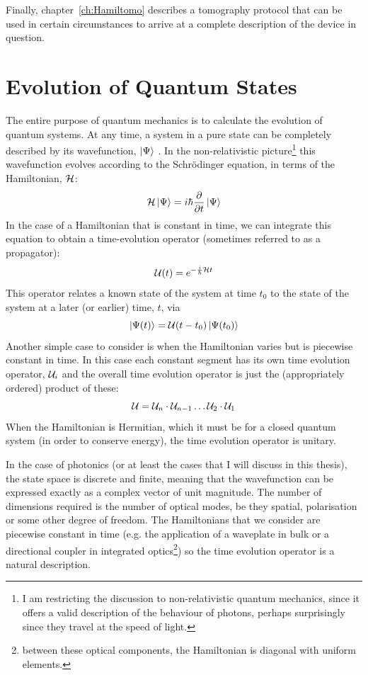 Finally, chapter~\ref{ch:Hamiltomo} describes a tomography protocol that can be
used in certain circumstances to arrive at a complete description of the device
in question.

\section{Evolution of Quantum States}
\label{sec:Evolution}
The entire purpose of quantum mechanics is to calculate the evolution of quantum
systems. At any time, a system in a pure state can be completely described by
its wavefunction, \(\left|\Psi\right\rangle\) \cite{pbr}. In the non-relativistic
picture\footnote{I am restricting the discussion to non-relativistic quantum
mechanics, since it offers a valid description of the behaviour of photons,
perhaps surprisingly since they travel at the speed of light.} this
wavefunction evolves according to the Schr\"odinger equation, in terms of the
Hamiltonian, \(\mathcal{H}\):
\begin{equation}
  \mathcal{H} \left|\Psi\right\rangle = i \hbar \frac{\partial}{\partial t} \left|\Psi\right\rangle
\end{equation}
In the case of a Hamiltonian that is constant in time, we can integrate this
equation to obtain a time-evolution operator (sometimes referred to as a
propagator):
\begin{equation}
  \label{eq:expiht}
  \mathcal{U} \!\left(t\right) = e^{-\frac{i}{\hbar} \mathcal{H} t}
\end{equation}
This operator relates a known state of the system at time \(t_{0}\) to the state
of the system at a later (or earlier) time, \(t\), via
\begin{equation}
  \left| \Psi \!\left(t\right) \right\rangle = \mathcal{U} \!\left(t-t_{0}\right) \left| \Psi \!\left(t_{0}\right) \right\rangle
\end{equation}
Another simple case to consider is when the Hamiltonian varies but is piecewise
constant in time. In this case each constant segment has its own time evolution
operator, \(\mathcal{U}_{i}\) and  the overall time evolution operator is just the
(appropriately ordered) product of these:
\begin{equation}
  \mathcal{U} = \mathcal{U}_{n} \cdot \mathcal{U}_{n-1} \dots \mathcal{U}_{2} \cdot \mathcal{U}_{1}
\end{equation}
When the Hamiltonian is Hermitian, which it must be for a closed quantum system
(in order to conserve energy), the time evolution operator is unitary.

In the case of photonics (or at least the cases that I will discuss in this
thesis), the state space is discrete and finite, meaning that the wavefunction
can be expressed exactly as a complex vector of unit magnitude. The number of
dimensions required is the number of optical modes, be they spatial,
polarisation or some other degree of freedom. The Hamiltonians that we consider
are piecewise constant in time (e.g. the application of a waveplate in bulk or
a directional coupler in integrated optics\footnote{between these optical
components, the Hamiltonian is diagonal with uniform elements.}) so the time
evolution operator is a natural description.

